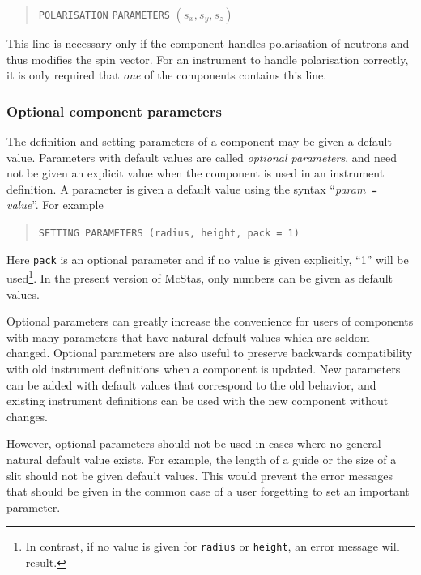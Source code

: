 \begin{quote}
  \texttt{POLARISATION} \texttt{PARAMETERS} $(s_x,s_y,s_z)$
\end{quote}
This line is necessary only if the component handles polarisation of neutrons
and thus modifies the spin vector. For an instrument to handle polarisation
correctly, it is only required that {\em one} of the components contains this
line.

\subsubsection{Optional component parameters}

The definition and setting parameters of a component may be given a
default value. Parameters with default values are called \emph{optional
  parameters}, and need not be given an explicit value when the
component is used in an instrument definition. A parameter is given a
default value using the syntax ``\textit{param}\texttt{ = }\textit{value}''.
For example
\begin{quote}
  \texttt{SETTING PARAMETERS (radius, height, pack = 1)}
\end{quote}
Here \verb+pack+ is an optional parameter and if no value is given
explicitly, ``1'' will be used\footnote{In contrast, if no value is
  given for \texttt{radius} or \texttt{height}, an error message will
  result.}. In the present version of McStas, only numbers can be given
as default values.

Optional parameters can greatly increase the convenience for users of
components with many parameters that have natural default values which
are seldom changed. Optional parameters are also useful to preserve
backwards compatibility with old instrument definitions when a component
is updated. New parameters can be added with default values that
correspond to the old behavior, and existing instrument definitions can
be used with the new component without changes.

However, optional parameters should not be used in cases where no
general natural default value exists. For example, the length of a guide
or the size of a slit should not be given default values. This would
prevent the error messages that should be given in the common case of a
user forgetting to set an important parameter.


